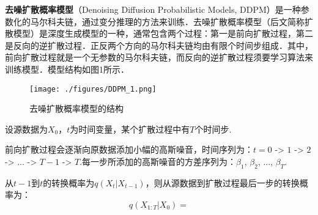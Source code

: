 
\textbf{去噪扩散概率模型}（Denoising Diffusion Probabilistic Models, DDPM）是一种参数化的马尔科夫链，通过变分推理的方法来训练．去噪扩散概率模型（后文简称扩散模型）是深度生成模型的一种，通常包含两个过程：第一是前向扩散过程，第二是反向的逆扩散过程．正反两个方向的马尔科夫链均由有限个时间步组成．其中，前向扩散过程就是一个无参数的马尔科夫链，而反向的逆扩散过程须要学习算法来训练模型．模型结构如图1所示．
\begin{figure}[ht]
\centering
\texttt{[image: ./figures/DDPM\_1.png]}
\caption{去噪扩散概率模型的结构} \label{DDPM_fig1}
\end{figure}

设源数据为$X_0$，$t$为时间变量，某个扩散过程中有$T$个时间步.

前向扩散过程会逐渐向原数据添加小幅的高斯噪音，时间序列为：$t=0$ -> $1$ -> $2$ -> ... -> $T-1$ -> $T$.每一步所添加的高斯噪音的方差序列为：$\beta_1$, $\beta_2$, ..., $\beta_T$.

从$t-1$到$t$的转换概率为$q(X_t|X_{t-1})$，则从源数据到扩散过程最后一步的转换概率为：
\begin{equation}
q(X_{1:T}|X_0)=
\end{equation}


